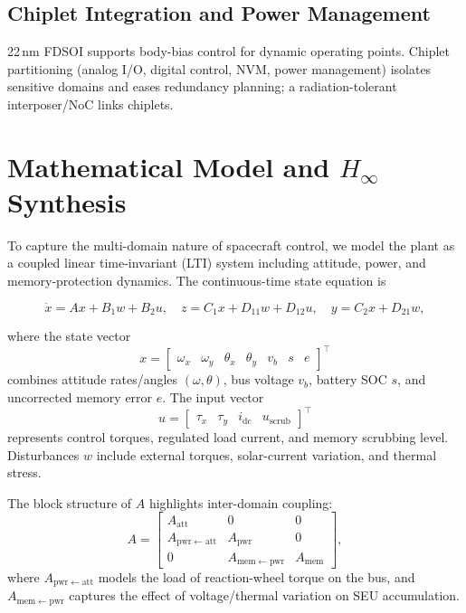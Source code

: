 \documentclass[conference]{IEEEtran}
\begin{document}
\subsection{Chiplet Integration and Power Management}
22\,nm FDSOI supports body-bias control for dynamic operating points. Chiplet partitioning
(analog I/O, digital control, NVM, power management) isolates sensitive domains and
eases redundancy planning; a radiation-tolerant interposer/NoC links chiplets.

\section{Mathematical Model and $H_\infty$ Synthesis}

To capture the multi-domain nature of spacecraft control, we model the plant
as a coupled linear time-invariant (LTI) system including attitude, power, and
memory-protection dynamics. The continuous-time state equation is

\begin{equation}
\dot{x} = A x + B_1 w + B_2 u, \quad
z = C_1 x + D_{11} w + D_{12} u, \quad
y = C_2 x + D_{21} w,
\end{equation}

where the state vector
\[
x = \begin{bmatrix}
\omega_x & \omega_y & \theta_x & \theta_y & v_b & s & e
\end{bmatrix}^\top
\]
combines attitude rates/angles $(\omega,\theta)$, bus voltage $v_b$, battery SOC $s$,
and uncorrected memory error $e$.
The input vector
\[
u = \begin{bmatrix}
\tau_x & \tau_y & i_{\mathrm{dc}} & u_{\mathrm{scrub}}
\end{bmatrix}^\top
\]
represents control torques, regulated load current, and memory scrubbing level.
Disturbances $w$ include external torques, solar-current variation, and thermal stress.

The block structure of $A$ highlights inter-domain coupling:
\[
A =
\begin{bmatrix}
A_{\mathrm{att}} & 0 & 0 \\
A_{\mathrm{pwr}\leftarrow\mathrm{att}} & A_{\mathrm{pwr}} & 0 \\
0 & A_{\mathrm{mem}\leftarrow\mathrm{pwr}} & A_{\mathrm{mem}}
\end{bmatrix},
\]
where $A_{\mathrm{pwr}\leftarrow\mathrm{att}}$ models the load of
reaction-wheel torque on the bus, and
$A_{\mathrm{mem}\leftarrow\mathrm{pwr}}$ captures the effect of
voltage/thermal variation on SEU accumulation.
\end{document}
